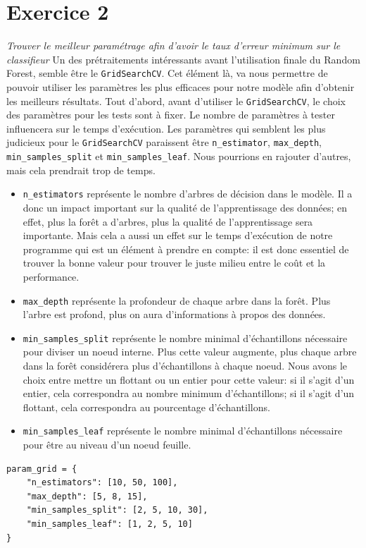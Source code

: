 \documentclass[a4paper, 12pt, oneside]{book}
\newcounter{program}[subsection]
\begin{document}
\section{Exercice 2}
\textit{Trouver le meilleur paramétrage afin d’avoir le taux d’erreur minimum sur le classifieur}
\newline \newline
Un des prétraitements intéressants avant l'utilisation finale du Random Forest, semble être le \texttt{GridSearchCV}. Cet élément là, va nous permettre de pouvoir utiliser les paramètres les plus efficaces pour notre modèle afin d'obtenir les meilleurs résultats. Tout d'abord, avant d'utiliser le \texttt{GridSearchCV}, le choix des paramètres pour les tests sont à fixer. Le nombre de paramètres à tester influencera sur le temps d'exécution. Les paramètres qui semblent les plus judicieux pour le \texttt{GridSearchCV} paraissent être \texttt{n\_estimator}, \texttt{max\_depth}, \texttt{min\_samples\_split} et \texttt{min\_samples\_leaf}. Nous pourrions en rajouter d'autres, mais cela prendrait trop de temps. 
\begin{itemize}
\item \texttt{n\_estimators} représente le nombre d'arbres de décision dans le modèle. Il a donc un impact important sur la qualité de l'apprentissage des données; en effet, plus la forêt a d'arbres, plus la qualité de l'apprentissage sera importante. Mais cela a aussi un effet sur le temps d'exécution de notre programme qui est un élément à prendre en compte: il est donc essentiel de trouver la bonne valeur pour trouver le juste milieu entre le coût et la performance. 
\item \texttt{max\_depth} représente la profondeur de chaque arbre dans la forêt. Plus l'arbre est profond, plus on aura d'informations à propos des données.
\item \texttt{min\_samples\_split} représente le nombre minimal d'échantillons nécessaire pour diviser un noeud interne. Plus cette valeur augmente, plus chaque arbre dans la forêt considérera plus d'échantillons à chaque noeud. Nous avons le choix entre mettre un flottant ou un entier pour cette valeur: si il s'agit d'un entier, cela correspondra au nombre minimum d'échantillons; si il s'agit d'un flottant, cela correspondra au pourcentage d'échantillons.
\item \texttt{min\_samples\_leaf} représente le nombre minimal d'échantillons nécessaire pour être au niveau d'un noeud feuille.
\end{itemize}
\begin{verbatim}
param_grid = {
    "n_estimators": [10, 50, 100],
    "max_depth": [5, 8, 15],
    "min_samples_split": [2, 5, 10, 30],
    "min_samples_leaf": [1, 2, 5, 10]
}
\end{verbatim}
\end{document}

